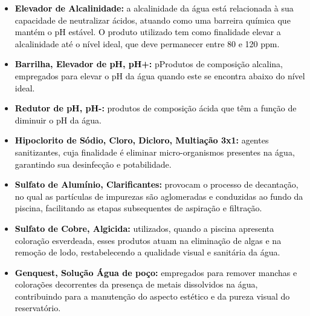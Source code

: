 \begin{itemize}
                \begin{itemize}
    
                    \item \textbf{\textcolor{black}{Elevador de Alcalinidade:}} \textcolor{black}{a alcalinidade da água está relacionada à sua capacidade de neutralizar ácidos, atuando como uma barreira química que mantém o pH estável. O produto utilizado tem como finalidade elevar a alcalinidade até o nível ideal, que deve permanecer entre 80 e 120 ppm.}
    
                    \item \textbf{\textcolor{black}{Barrilha, Elevador de pH, pH+:}} \textcolor{black}{pProdutos de composição alcalina, empregados para elevar o pH da água quando este se encontra abaixo do nível ideal.}
    
                    \item \textbf{\textcolor{black}{Redutor de pH, pH-:}} \textcolor{black}{produtos de composição ácida que têm a função de diminuir o pH da água.}
    
                    \item \textbf{\textcolor{black}{Hipoclorito de Sódio, Cloro, Dicloro, Multiação 3x1:}} \textcolor{black}{agentes sanitizantes, cuja finalidade é eliminar micro-organismos presentes na água, garantindo sua desinfecção e potabilidade.}
    
                    \item \textbf{\textcolor{black}{Sulfato de Alumínio, Clarificantes:}} \textcolor{black}{provocam o processo de decantação, no qual as partículas de impurezas são aglomeradas e conduzidas ao fundo da piscina, facilitando as etapas subsequentes de aspiração e filtração.}
    
                    \item \textbf{\textcolor{black}{Sulfato de Cobre, Algicida:}} \textcolor{black}{utilizados, quando a piscina apresenta coloração esverdeada, esses produtos atuam na eliminação de algas e na remoção de lodo, restabelecendo a qualidade visual e sanitária da água.}
    
                    \item \textbf{\textcolor{black}{Genquest, Solução Água de poço:}} \textcolor{black}{empregados para remover manchas e colorações decorrentes da presença de metais dissolvidos na água, contribuindo para a manutenção do aspecto estético e da pureza visual do reservatório.}
    
                \end{itemize}
                

\end{itemize}
